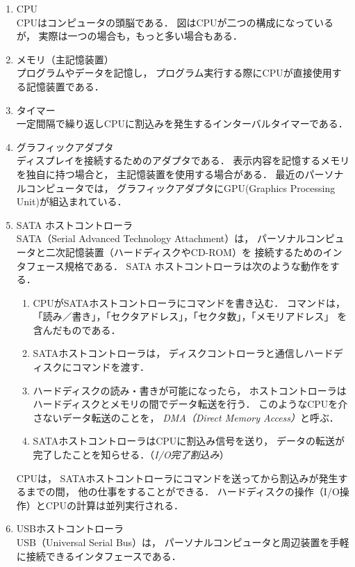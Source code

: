 \begin{enumerate}
\item CPU \\
  CPUはコンピュータの頭脳である．
  図はCPUが二つの構成になっているが，
  実際は一つの場合も，もっと多い場合もある．
\item メモリ（主記憶装置） \\
  プログラムやデータを記憶し，
  プログラム実行する際にCPUが直接使用する記憶装置である．
\item タイマー \\
  一定間隔で繰り返しCPUに割込みを発生するインターバルタイマーである．
\item グラフィックアダプタ \\
  ディスプレイを接続するためのアダプタである．
  表示内容を記憶するメモリを独自に持つ場合と，
  主記憶装置を使用する場合がある．
  最近のパーソナルコンピュータでは，
  グラフィックアダプタにGPU(Graphics Processing Unit)が組込まれている．
\item SATA ホストコントローラ　\\
  SATA（Serial Advanced Technology Attachment）は，
  パーソナルコンピュータと二次記憶装置（ハードディスクやCD-ROM）を
  接続するためのインタフェース規格である．
  SATA ホストコントローラは次のような動作をする．
  \begin{enumerate}
  \item CPUがSATAホストコントローラにコマンドを書き込む．
    コマンドは，
    「読み／書き」，「セクタアドレス」，「セクタ数」，「メモリアドレス」
    を含んだものである．
  \item SATAホストコントローラは，
    ディスクコントローラと通信しハードディスクにコマンドを渡す．
  \item ハードディスクの読み・書きが可能になったら，
    ホストコントローラはハードディスクとメモリの間でデータ転送を行う．
    このようなCPUを介さないデータ転送のことを，
    \emph{DMA（Direct Memory Access）}\label{dma}と呼ぶ．
  \item SATAホストコントローラはCPUに割込み信号を送り，
    データの転送が完了したことを知らせる．（\emph{I/O完了割込み}）
  \end{enumerate}
  CPUは，
  SATAホストコントローラにコマンドを送ってから割込みが発生するまでの間，
  他の仕事をすることができる．
  ハードディスクの操作（I/O操作）とCPUの計算は並列実行される．
\item USBホストコントローラ \\
  USB（Universal Serial Bus）は，
  パーソナルコンピュータと周辺装置を手軽に接続できるインタフェースである．

\end{enumerate}
